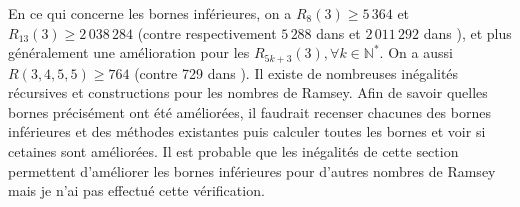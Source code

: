 \documentclass{article}
\begin{document}
En ce qui concerne les bornes inférieures, on a  \(R_8(3) \geqslant 5\,364\) et \(R_{13}(3)\geqslant 2\,038\,284\) (contre respectivement \(5\,288\) dans \cite{RowleyRamsey} et \(2\,011\,292\) dans \cite{schurboyz}), et plus généralement une amélioration pour les \(R_{5 k + 3}(3), \forall k \in \mathbb{N}^*\). On a aussi \(R(3 , 4 , 5 , 5) \geqslant 764\) (contre 729 dans \cite{rowleyramseysat}). Il existe de nombreuses inégalités récursives et constructions pour les nombres de Ramsey. Afin de savoir quelles bornes précisément ont été améliorées, il faudrait recenser chacunes des bornes inférieures et des méthodes existantes puis calculer toutes les bornes et voir si cetaines sont améliorées. Il est probable que les inégalités de cette section permettent d'améliorer les bornes inférieures pour d'autres nombres de Ramsey mais je n'ai pas effectué cette vérification.



\end{document}

